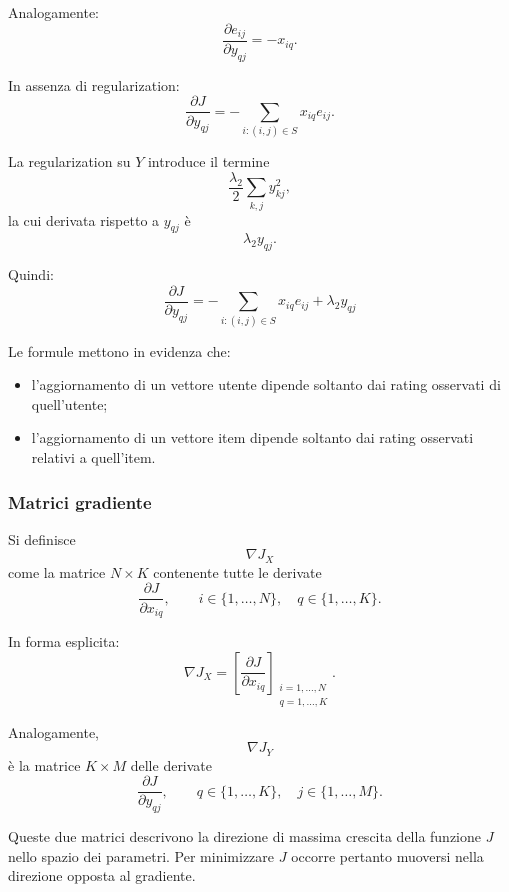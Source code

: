 Analogamente:
\[
\frac{\partial e_{ij}}{\partial y_{qj}}
=
-x_{iq}.
\]

In assenza di regularization:
\begin{equation*}
\frac{\partial J}{\partial y_{qj}}
=
-
\sum_{i:(i,j)\in S}
x_{iq}e_{ij}.
\end{equation*}

La regularization su $Y$ introduce il termine
\[
\frac{\lambda_2}{2}
\sum_{k,j}y_{kj}^{2},
\]
la cui derivata rispetto a $y_{qj}$ è
\[
\lambda_2y_{qj}.
\]

Quindi:
\begin{equation*}
\boxed{
\frac{\partial J}{\partial y_{qj}}
=
-
\sum_{i:(i,j)\in S}
x_{iq}e_{ij}
+
\lambda_2y_{qj}
}
\end{equation*}

Le formule mettono in evidenza che:
\begin{itemize}
    \item l'aggiornamento di un vettore utente dipende soltanto dai rating osservati di quell'utente;
    \item l'aggiornamento di un vettore item dipende soltanto dai rating osservati relativi a quell'item.
\end{itemize}

\subsubsection{Matrici gradiente}

Si definisce
\[
\nabla J_X
\]
come la matrice $N\times K$ contenente tutte le derivate
\[
\frac{\partial J}{\partial x_{iq}},
\qquad
i\in\{1,\ldots,N\},
\quad
q\in\{1,\ldots,K\}.
\]

In forma esplicita:
\[
\nabla J_X
=
\left[
\frac{\partial J}{\partial x_{iq}}
\right]_
{\substack{i=1,\ldots,N\\q=1,\ldots,K}}.
\]

Analogamente,
\[
\nabla J_Y
\]
è la matrice $K\times M$ delle derivate
\[
\frac{\partial J}{\partial y_{qj}},
\qquad
q\in\{1,\ldots,K\},
\quad
j\in\{1,\ldots,M\}.
\]

Queste due matrici descrivono la direzione di massima crescita della funzione $J$ nello spazio dei parametri. Per minimizzare $J$ occorre pertanto muoversi nella direzione opposta al gradiente.

